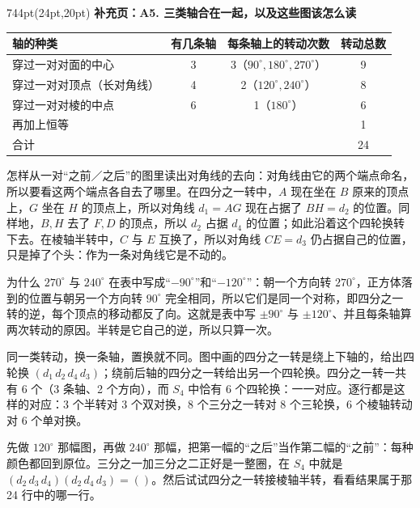 \documentclass[10pt]{article}
\newcommand{\interlude}[2]{%
  \begin{textblock*}{744pt}(24pt,20pt)
    {\sffamily\bfseries\large\color{big} 补充页：#1}\par\vspace{4pt}
    \small #2\end{textblock*}\mbox{}\clearpage}
\begin{document}
\interlude{A5. 三类轴合在一起，以及这些图该怎么读}{
\begin{minipage}[t]{744pt}\vspace{0pt}
\small
\begin{center}
\begin{tabular}{@{}lccc@{}}
\toprule
轴的种类 & 有几条轴 & 每条轴上的转动次数 & 转动总数\\
\midrule
穿过一对对面的中心 & 3 & 3（$90^\circ,180^\circ,270^\circ$） & 9\\
穿过一对对顶点（长对角线） & 4 & 2（$120^\circ,240^\circ$） & 8\\
穿过一对对棱的中点 & 6 & 1（$180^\circ$） & 6\\
\midrule
再加上恒等 & & & 1\\
合计 & & & 24\\
\bottomrule
\end{tabular}
\end{center}
\vspace{8pt}
\begin{minipage}[t]{360pt}\vspace{0pt}\raggedright
\begin{why}
怎样从一对“之前／之后”的图里读出对角线的去向：对角线由它的两个端点命名，所以要看这两个端点各自去了哪里。在四分之一转中，$A$ 现在坐在 $B$ 原来的顶点上，$G$ 坐在 $H$ 的顶点上，所以对角线 $d_1=AG$ 现在占据了 $BH=d_2$ 的位置。同样地，$B,H$ 去了 $F,D$ 的顶点，所以 $d_2$ 占据 $d_4$ 的位置；如此沿着这个四轮换转下去。在棱轴半转中，$C$ 与 $E$ 互换了，所以对角线 $CE=d_3$ 仍占据自己的位置，只是掉了个头：作为一条对角线它是不动的。
\end{why}
\begin{why}
为什么 $270^\circ$ 与 $240^\circ$ 在表中写成“$-90^\circ$”和“$-120^\circ$”：朝一个方向转 $270^\circ$，正方体落到的位置与朝另一个方向转 $90^\circ$ 完全相同，所以它们是同一个对称，即四分之一转的逆，每个顶点的移动都反了向。这就是表中写 $\pm90^\circ$ 与 $\pm120^\circ$、并且每条轴算两次转动的原因。半转是它自己的逆，所以只算一次。
\end{why}
\end{minipage}\hfill
\begin{minipage}[t]{360pt}\vspace{0pt}\raggedright
\begin{pitfall}
同一类转动，换一条轴，置换就不同。图中画的四分之一转是绕上下轴的，给出四轮换 $(d_1\,d_2\,d_4\,d_3)$；绕前后轴的四分之一转给出另一个四轮换。四分之一转一共有 6 个（3 条轴、2 个方向），而 $S_4$ 中恰有 6 个四轮换：一一对应。逐行都是这样的对应：3 个半转对 3 个双对换，8 个三分之一转对 8 个三轮换，6 个棱轴转动对 6 个单对换。
\end{pitfall}
\begin{tryit}
先做 $120^\circ$ 那幅图，再做 $240^\circ$ 那幅，把第一幅的“之后”当作第二幅的“之前”：每种颜色都回到原位。三分之一加三分之二正好是一整圈，在 $S_4$ 中就是 $(d_2\,d_3\,d_4)(d_2\,d_4\,d_3)=()$。然后试试四分之一转接棱轴半转，看看结果属于那 24 行中的哪一行。
\end{tryit}
\end{minipage}
\end{minipage}
}
\end{document}
